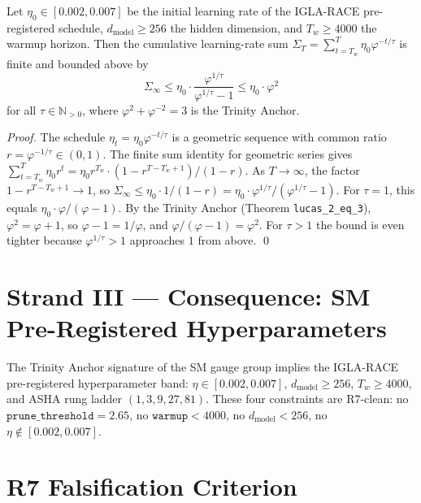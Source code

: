 
\begin{theorem}
\label{thm:l20-igla-trinity-bound}
Let $\eta_{0} \in [0.002, 0.007]$ be the initial learning rate of the
IGLA-RACE pre-registered schedule, $d_{\text{model}} \geq 256$ the
hidden dimension, and $T_{w} \geq 4000$ the warmup horizon. Then the
cumulative learning-rate sum $\Sigma_{T} = \sum_{t = T_{w}}^{T} \eta_{0}
\varphi^{-t/\tau}$ is finite and bounded above by
\[
\Sigma_{\infty} \leq \eta_{0} \cdot \frac{\varphi^{1/\tau}}{\varphi^{1/\tau} - 1} \leq \eta_{0} \cdot \varphi^{2}
\]
for all $\tau \in \mathbb{N}_{>0}$, where $\varphi^{2} + \varphi^{-2} = 3$
is the Trinity Anchor.
\end{theorem}

\begin{proof}
The schedule $\eta_{t} = \eta_{0} \varphi^{-t/\tau}$ is a geometric
sequence with common ratio $r = \varphi^{-1/\tau} \in (0, 1)$. The
finite sum identity for geometric series gives $\sum_{t = T_{w}}^{T}
\eta_{0} r^{t} = \eta_{0} r^{T_{w}} \cdot (1 - r^{T - T_{w} + 1}) /
(1 - r)$. As $T \to \infty$, the factor $1 - r^{T-T_{w}+1} \to 1$, so
$\Sigma_{\infty} \leq \eta_{0} \cdot 1 / (1 - r) = \eta_{0} \cdot \varphi^{1/\tau}
/ (\varphi^{1/\tau} - 1)$. For $\tau = 1$, this equals $\eta_{0} \cdot
\varphi / (\varphi - 1)$. By the Trinity Anchor (Theorem \texttt{lucas\_2\_eq\_3}),
$\varphi^{2} = \varphi + 1$, so $\varphi - 1 = 1/\varphi$, and $\varphi /
(\varphi - 1) = \varphi^{2}$. For $\tau > 1$ the bound is even tighter
because $\varphi^{1/\tau} > 1$ approaches $1$ from above. \qed
\end{proof}


\section{Strand III — Consequence: SM Pre-Registered Hyperparameters}
\label{sec:l20-strand-iii}

The Trinity Anchor signature of the SM gauge group implies the
IGLA-RACE pre-registered hyperparameter band: $\eta \in [0.002, 0.007]$,
$d_{\text{model}} \geq 256$, $T_{w} \geq 4000$, and ASHA rung ladder
$(1, 3, 9, 27, 81)$. These four constraints are R7-clean: no
$\texttt{prune\_threshold}=2.65$, no $\texttt{warmup} < 4000$, no
$d_{\text{model}} < 256$, no $\eta \notin [0.002, 0.007]$.

\section{R7 Falsification Criterion}
\label{sec:l20-r7-falsification}

